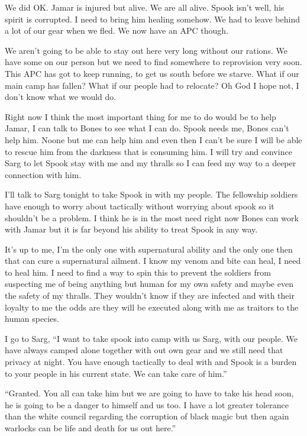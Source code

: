 We did OK. Jamar is injured but alive. We are all alive. Spook isn't well, his spirit is corrupted. I need to bring him healing somehow. We had to leave behind a lot of our gear when we fled. We now have an APC though.

We aren't going to be able to stay out here very long without our rations. We have some on our person but we need to find somewhere to reprovision very soon. This APC has got to keep running, to get us south before we starve. What if our main camp has fallen? What if our people had to relocate? Oh God I hope not, I don't know what we would do.

Right now I think the most important thing for me to do would be to help Jamar, I can talk to Bones to see what I can do. Spook needs me, Bones can't help him. Noone but me can help him and even then I can't be sure I will be able to rescue him from the darkness that is consuming him. I will try and convince Sarg to let Spook stay with me and my thralls so I can feed my way to a deeper connection with him.

I'll talk to Sarg tonight to take Spook in with my people. The fellowship soldiers have enough to worry about tactically without worrying about spook so it shouldn't be a problem. I think he is in the most need right now Bones can work with Jamar but it is far beyond his ability to treat Spook in any way.

It's up to me, I'm the only one with supernatural ability and the only one then that can cure a supernatural ailment. I know my venom and bite can heal, I need to heal him. I need to find a way to spin this to prevent the soldiers from suspecting me of being anything but human for my own safety and maybe even the safety of my thralls. They wouldn't know if they are infected and with their loyalty to me the odds are they will be executed along with me as traitors to the human species.

I go to Sarg, ``I want to take spook into camp with us Sarg, with our people. We have always camped alone together with out own gear and we still need that privacy at night. You have enough tactically to deal with and Spook is a burden to your people in his current state. We can take care of him.''

``Granted. You all can take him but we are going to have to take his head soon, he is going to be a danger to himself and us too. I have a lot greater tolerance than the white council regarding the corruption of black magic but then again warlocks can be life and death for us out here.''

